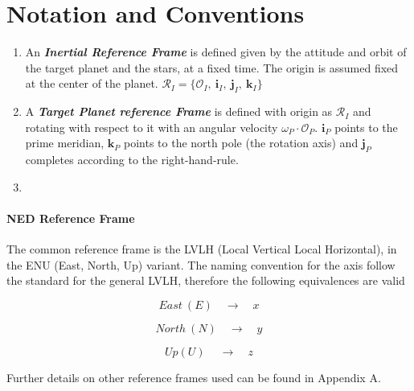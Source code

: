 \newpage
\chapter{Notation and Conventions}

   \begin{enumerate}
      \item An \textbf{\textit{Inertial Reference Frame}} is defined given by the attitude and orbit of the target planet
         and the stars, at a fixed time.
         The origin is assumed fixed at the center of the planet.
         $\mathcal{R}_{I}=\{ \mathcal{O}_{I},\: \textbf{i}_{I},\:\textbf{j}_I,\: \textbf{k}_I \}$

      \item A \textbf{\textit{Target Planet reference Frame}} is defined with 
         origin as $\mathcal{R}_{I}$ and rotating with respect to it with an angular
         velocity $\omega_{P}\cdot \mathcal{O}_{P}$.
         $\textbf{i}_{P}$ points to the prime meridian, $\textbf{k}_{P}$ points to the
         north pole (the rotation axis) and $\textbf{j}_{P}$ completes according
         to the right-hand-rule.

      \item 
   
   \end{enumerate}


\newpage
\subsubsection{NED Reference Frame}

   The common reference frame is the LVLH (Local Vertical Local Horizontal), in the ENU (East, North, Up) variant.
   The naming convention for the axis follow the standard for the general LVLH, therefore the following equivalences are valid

   $$
      East\: (E) \quad\to\quad x
   $$

   $$
      North\: (N) \quad\to\quad y
   $$

   $$
      Up (U)\: \quad\to\quad z
   $$

Further details on other reference frames used can be found in Appendix A.